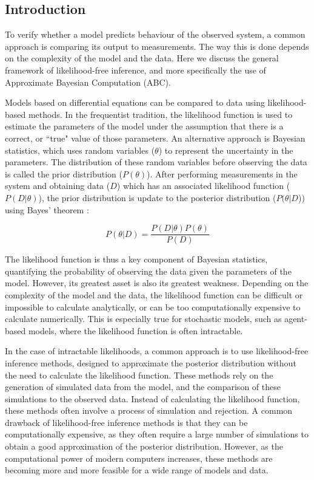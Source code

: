 \subsection{Introduction}
To verify whether a model predicts behaviour of the observed system, a common
approach is comparing its output to measurements. The way this is done depends
on the complexity of the model and the data. Here we discuss the general
framework of likelihood-free inference, and more specifically the use of
Approximate Bayesian Computation (ABC). \par Models based on differential
equations can be compared to data using likelihood-based methods. In the
frequentist tradition, the likelihood function is used to estimate the
parameters of the model under the assumption that there is a correct, or
``true" value of those parameters. An alternative approach is Bayesian
statistics, which uses random variables ($\theta$) to represent the uncertainty
in the parameters. The distribution of these random variables before observing
the data is called the prior distribution ($P(\theta)$). After performing
measurements in the system and obtaining data ($D$) which has an associated
likelihood function ($P(D|\theta)$), the prior distribution is update to the
posterior distribution ($P(\theta|D$)) using Bayes' theorem
\cite{bayes_essay_1763}:

\begin{equation}
    P(\theta|D) = \frac{P(D|\theta)P(\theta)}{P(D)}
\end{equation}

The likelihood function is thus a key component of Bayesian statistics,
quantifying the probability of observing the data given the parameters of the
model. However, its greatest asset is also its greatest weakness. Depending on
the complexity of the model and the data, the likelihood function can be
difficult or impossible to calculate analytically, or can be too
computationally expensive to calculate numerically. This is especially true for
stochastic models, such as agent-based models, where the likelihood function is
often intractable. \par In the case of intractable likelihoods, a common
approach is to use likelihood-free inference methods, designed to approximate
the posterior distribution without the need to calculate the likelihood
function. These methods rely on the generation of simulated data from the
model, and the comparison of these simulations to the observed data. Instead of
calculating the likelihood function, these methods often involve a process of
simulation and rejection. A common drawback of likelihood-free inference
methods is that they can be computationally expensive, as they often require a
large number of simulations to obtain a good approximation of the posterior
distribution. However, as the computational power of modern computers
increases, these methods are becoming more and more feasible for a wide range
of models and data.

